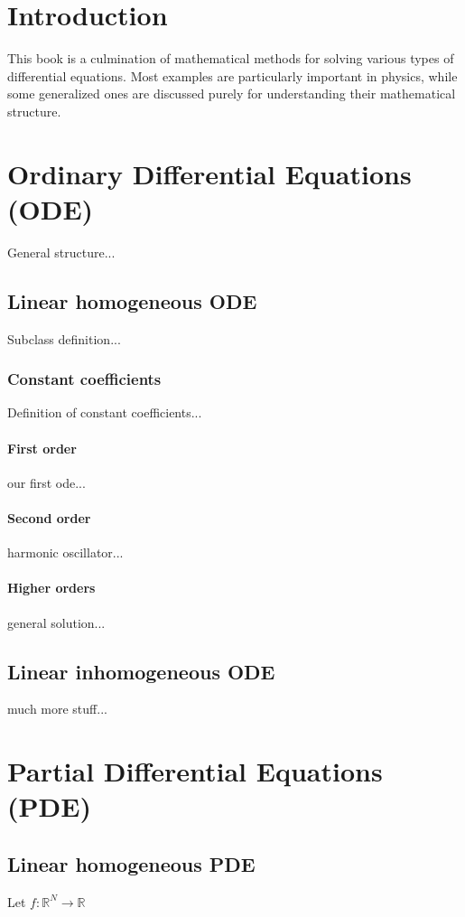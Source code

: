 \documentclass[english, parskip=full]{scrreprt}
\title{\titel}
\author{\autor}
\date{\today}
\begin{document}
\begin{titlepage}
\maketitle  %
\tableofcontents  %
\end{titlepage}

\chapter{Introduction}
This book is a culmination of mathematical methods for solving various types of differential equations. Most examples are particularly important in physics, while some generalized ones are discussed purely for understanding their mathematical structure.
\chapter{Ordinary Differential Equations (ODE)}
General structure...
\section{Linear homogeneous ODE}
Subclass definition...
\subsection{Constant coefficients}
Definition of constant coefficients...
\subsubsection{First order}\label{sss:ODE linhom cc first order}
our first ode...
\subsubsection{Second order}
harmonic oscillator...
\subsubsection{Higher orders}
general solution...
\section{Linear inhomogeneous ODE}
much more stuff...
\chapter{Partial Differential Equations (PDE)}
\section{Linear homogeneous PDE}
Let $f:\mathbb{R}^N\rightarrow\mathbb{R}$
\end{document}
